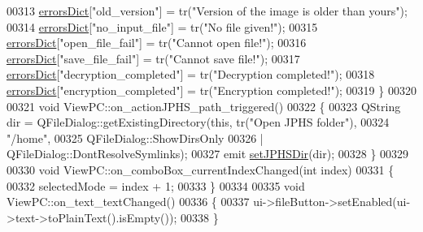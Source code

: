 \begin{DoxyCode}
00313     \hyperlink{class_view_p_c_aaf7f058e5589d65fec72a21abfd5629b}{errorsDict}[\textcolor{stringliteral}{"old\_version"}] = tr(\textcolor{stringliteral}{"Version of the image is older than yours"});
00314     \hyperlink{class_view_p_c_aaf7f058e5589d65fec72a21abfd5629b}{errorsDict}[\textcolor{stringliteral}{"no\_input\_file"}] = tr(\textcolor{stringliteral}{"No file given!"});
00315     \hyperlink{class_view_p_c_aaf7f058e5589d65fec72a21abfd5629b}{errorsDict}[\textcolor{stringliteral}{"open\_file\_fail"}] = tr(\textcolor{stringliteral}{"Cannot open file!"});
00316     \hyperlink{class_view_p_c_aaf7f058e5589d65fec72a21abfd5629b}{errorsDict}[\textcolor{stringliteral}{"save\_file\_fail"}] = tr(\textcolor{stringliteral}{"Cannot save file!"});
00317     \hyperlink{class_view_p_c_aaf7f058e5589d65fec72a21abfd5629b}{errorsDict}[\textcolor{stringliteral}{"decryption\_completed"}] = tr(\textcolor{stringliteral}{"Decryption completed!"});
00318     \hyperlink{class_view_p_c_aaf7f058e5589d65fec72a21abfd5629b}{errorsDict}[\textcolor{stringliteral}{"encryption\_completed"}] = tr(\textcolor{stringliteral}{"Encryption completed!"});
00319 \}
00320 
00321 \textcolor{keywordtype}{void} ViewPC::on\_actionJPHS\_path\_triggered()
00322 \{
00323     QString dir = QFileDialog::getExistingDirectory(\textcolor{keyword}{this}, tr(\textcolor{stringliteral}{"Open JPHS folder"}),
00324                                                     \textcolor{stringliteral}{"/home"},
00325                                                     QFileDialog::ShowDirsOnly
00326                                                     | QFileDialog::DontResolveSymlinks);
00327     emit \hyperlink{class_view_p_c_ae81085836c0c01bc9556a5b27eb8d19c}{setJPHSDir}(dir);
00328 \}
00329 
00330 \textcolor{keywordtype}{void} ViewPC::on\_comboBox\_currentIndexChanged(\textcolor{keywordtype}{int} index)
00331 \{
00332     selectedMode = index + 1;
00333 \}
00334 
00335 \textcolor{keywordtype}{void} ViewPC::on\_text\_textChanged()
00336 \{
00337     ui->fileButton->setEnabled(ui->text->toPlainText().isEmpty());
00338 \}
\end{DoxyCode}
